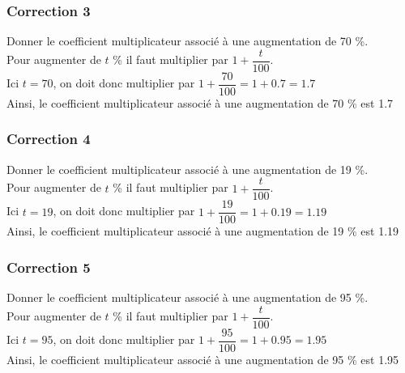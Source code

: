 \documentclass[15pt, mathserif]{beamer}
\begin{document}
\begin{frame}
\vspace{-10mm}
	\frametitle{Correction 3}
Donner le coefficient multiplicateur associé à une augmentation de 70 \%. \\ \bigskip 
 Pour augmenter de $t$ \%  il faut multiplier par $1+\dfrac{t}{100}$. \\ \bigskip Ici $t=70$, on doit donc multiplier par  $1+\dfrac{70}{100}=1+0.7=1.7$ \\ \bigskip Ainsi, le coefficient multiplicateur associé à une augmentation de 70 \% est 1.7\end{frame}


\begin{frame}
\vspace{-10mm}
	\frametitle{Correction 4}
Donner le coefficient multiplicateur associé à une augmentation de 19 \%. \\ \bigskip 
 Pour augmenter de $t$ \%  il faut multiplier par $1+\dfrac{t}{100}$. \\ \bigskip Ici $t=19$, on doit donc multiplier par  $1+\dfrac{19}{100}=1+0.19=1.19$ \\ \bigskip Ainsi, le coefficient multiplicateur associé à une augmentation de 19 \% est 1.19\end{frame}


\begin{frame}
\vspace{-10mm}
	\frametitle{Correction 5}
Donner le coefficient multiplicateur associé à une augmentation de 95 \%. \\ \bigskip 
 Pour augmenter de $t$ \%  il faut multiplier par $1+\dfrac{t}{100}$. \\ \bigskip Ici $t=95$, on doit donc multiplier par  $1+\dfrac{95}{100}=1+0.95=1.95$ \\ \bigskip Ainsi, le coefficient multiplicateur associé à une augmentation de 95 \% est 1.95\end{frame}
\end{document}
